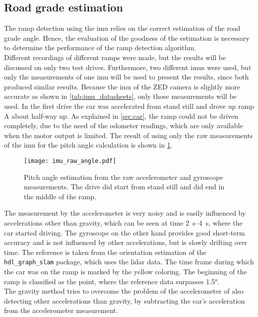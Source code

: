 \subsection{Road grade estimation}
The ramp detection using the \gls{imu} relies on the correct estimation of the road grade angle.
Hence, the evaluation of the goodness of the estimation is necessary to determine the performance of the ramp detection algorithm.\\
Different recordings of different ramps were made, but the results will be discussed on only two test drives.
Furthermore, two different \glspl{imu} were used, but only the measurements of one \gls{imu} will be used to present the results, since both produced similar results.
Because the \gls{imu} of the ZED camera is slightly more accurate as shown in \cref{tab:imu_datasheets}, only those measurements will be used.
In the first drive the car was accelerated from stand still and drove up ramp A about half-way up.
As explained in \cref{sec:car}, the ramp could not be driven completely, due to the need of the odometer readings, which are only available when the motor output is limited.
The result of using only the raw measurements of the \gls{imu} for the pitch angle calculation is shown in \cref{fig:imu_raw_angle}.
\begin{figure}[htb]
	\centering
	\texttt{[image: imu\_raw\_angle.pdf]}
	\caption[Angle estimation using raw measurements]{Pitch angle estimation from the raw accelerometer and gyroscope measurements. The drive did start from stand still and did end in the middle of the ramp.}
	\label{fig:imu_raw_angle}
\end{figure}
The measurement by the accelerometer is very noisy and is easily influenced by accelerations other than gravity, which can be seen at time \SIrange{2}{4}{\second}, where the car started driving.
The gyroscope on the other hand provides good short-term accuracy and is not influenced by other accelerations, but is slowly drifting over time.
The reference is taken from the orientation estimation of the \texttt{hdl\_graph\_slam} package, which uses the \gls{lidar} data.
The time frame during which the car was on the ramp is marked by the yellow coloring.
The beginning of the ramp is classified as the point, where the reference data surpasses \ang{1.5}.\\
The gravity method tries to overcome the problem of the accelerometer of also detecting other accelerations than gravity, by subtracting the car's acceleration from the accelerometer measurement.
